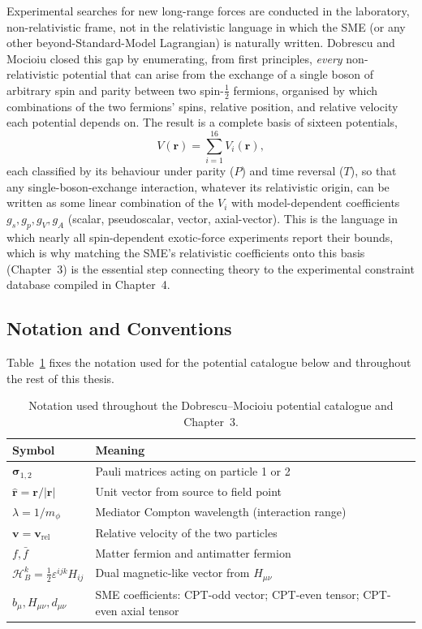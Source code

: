 \documentclass[main]{subfiles}
\begin{document}
Experimental searches for new long-range forces are conducted in the
laboratory, non-relativistic frame, not in the relativistic language in
which the SME (or any other beyond-Standard-Model Lagrangian) is naturally
written. Dobrescu and Mocioiu \cite{Dobrescu2006} closed this gap by
enumerating, from first principles, \emph{every} non-relativistic potential
that can arise from the exchange of a single boson of arbitrary spin and
parity between two spin-$\tfrac12$ fermions, organised by which
combinations of the two fermions' spins, relative position, and relative
velocity each potential depends on. The result is a complete basis of
sixteen potentials,
\begin{equation}
  V(\mathbf r) = \sum_{i=1}^{16} V_i(\mathbf r),
\end{equation}
each classified by its behaviour under parity ($P$) and time reversal
($T$), so that any single-boson-exchange interaction, whatever its
relativistic origin, can be written as some linear combination of the
$V_i$ with model-dependent coefficients $g_s,g_p,g_V,g_A$ (scalar,
pseudoscalar, vector, axial-vector). This is the language in which nearly
all spin-dependent exotic-force experiments report their bounds, which is
why matching the SME's relativistic coefficients onto this basis
(Chapter~3) is the essential step connecting theory to the experimental
constraint database compiled in Chapter~4.

\subsection{Notation and Conventions}

Table~\ref{tab:dm-notation} fixes the notation used for the potential
catalogue below and throughout the rest of this thesis.

\begin{table}[h]
\centering
\begin{tabular}{@{}l>{\raggedright\arraybackslash}p{9.5cm}@{}}
\toprule
Symbol & Meaning \\
\midrule
$\boldsymbol\sigma_{1,2}$ & Pauli matrices acting on particle 1 or 2 \\
$\hat{\mathbf r}=\mathbf r/|\mathbf r|$ & Unit vector from source to field point \\
$\lambda=1/m_\phi$ & Mediator Compton wavelength (interaction range) \\
$\mathbf v=\mathbf v_{\text{rel}}$ & Relative velocity of the two particles \\
$f,\bar f$ & Matter fermion and antimatter fermion \\
$\mathcal H_B^k=\tfrac12\varepsilon^{ijk}H_{ij}$ & Dual magnetic-like vector from $H_{\mu\nu}$ \\
$b_\mu, H_{\mu\nu}, d_{\mu\nu}$ & SME coefficients: CPT-odd vector; CPT-even tensor; CPT-even axial tensor \\
\bottomrule
\end{tabular}
\caption{Notation used throughout the Dobrescu--Mocioiu potential catalogue and Chapter~3.}
\label{tab:dm-notation}
\end{table}
\end{document}
